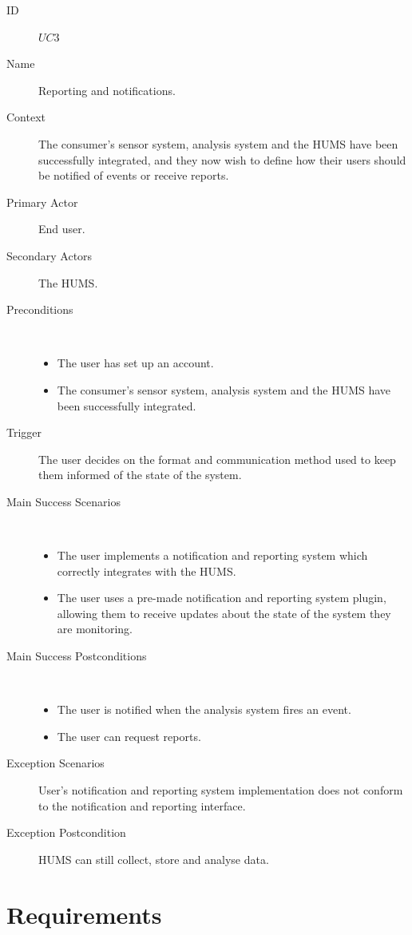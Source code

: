\documentclass[10pt,a4paper]{article}
\begin{document}
\begin{description}
	\item[ID] $UC3$
	\item[Name] Reporting and notifications.
	\item[Context] The consumer's sensor system, analysis system and the HUMS
	               have been successfully integrated, and they now wish to define
	               how their users should be notified of events or receive reports.
	\item[Primary Actor] End user.
	\item[Secondary Actors] The HUMS.
	\item[Preconditions] ~
			\begin{itemize}
			\item The user has set up an account.
			\item The consumer's sensor system, analysis system and the HUMS have
			      been successfully integrated.
			\end{itemize}
	\item[Trigger] The user decides on the format and communication method used
	               to keep them informed of the state of the system.
	\item[Main Success Scenarios] ~
			\begin{itemize}
				\item The user implements a notification and reporting system which
				      correctly integrates with the HUMS.
				\item The user uses a pre-made notification and reporting system plugin,
				 allowing them to receive updates about the state of the
				      system they are monitoring.
			\end{itemize}
	\item[Main Success Postconditions] ~
			\begin{itemize}
				\item The user is notified when the analysis system fires an event.
				\item The user can request reports.
			\end{itemize}
	\item[Exception Scenarios] User's notification and reporting system
			implementation does not conform to the notification and reporting
			interface.
	\item[Exception Postcondition] HUMS can still collect, store and analyse data.
\end{description}

\section{Requirements}
\end{document}
